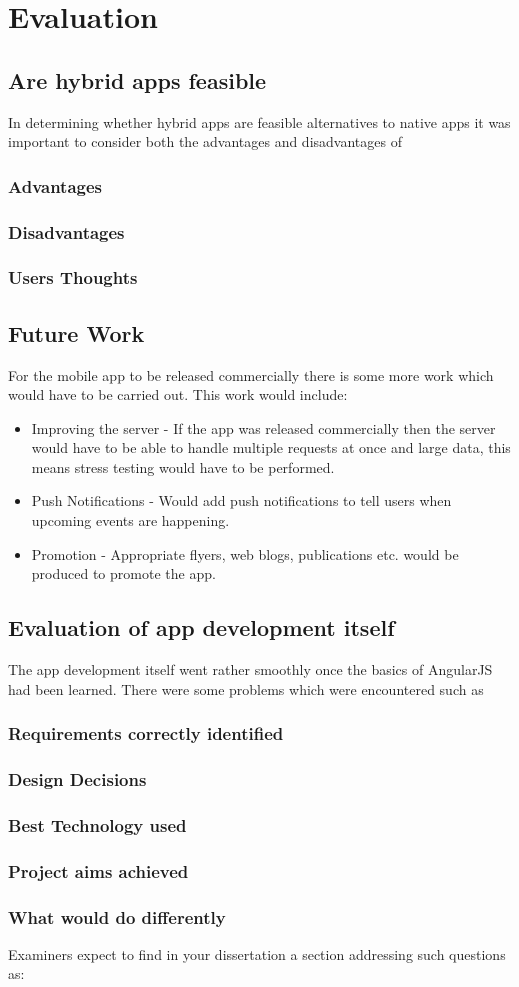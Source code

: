 \chapter{Evaluation}

\section{Are hybrid apps feasible}
In determining whether hybrid apps are feasible alternatives to native apps it was important to consider both the advantages and disadvantages of 

\subsection{Advantages}
\subsection{Disadvantages}
\subsection{Users Thoughts}

\section{Future Work}
For the mobile app to be released commercially there is some more work which would have to be carried out. This work would include:
\begin{itemize}
\item Improving the server - If the app was released commercially then the server would have to be able to handle multiple requests at once and large data, this means stress testing would have to be performed.
\item Push Notifications - Would add push notifications to tell users when upcoming events are happening.
\item Promotion - Appropriate flyers, web blogs, publications etc. would be produced to promote the app.
\end{itemize} 

\section{Evaluation of app development itself}
The app development itself went rather smoothly once the basics of AngularJS had been learned. There were some problems which were encountered such as     
\subsection{Requirements correctly identified}
\subsection{Design Decisions}
\subsection{Best Technology used}
\subsection{Project aims achieved}
\subsection{What would do differently}
Examiners expect to find in your dissertation a section addressing such questions as:


